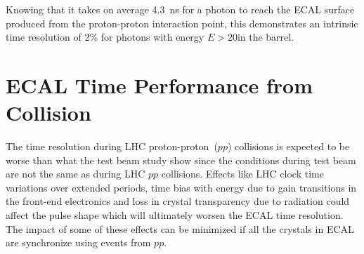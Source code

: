 \vspace{5mm}

Knowing that it takes on average 4.3~ns for a photon to reach the ECAL surface produced from the proton-proton interaction point, this demonstrates an intrinsic time resolution of 2\% for photons with energy $E > 20$\GeV in the barrel.%

\section{ECAL Time Performance from Collision}
The time resolution during LHC proton-proton~($pp$) collisions is expected to be worse than what the test beam study show since the conditions during test beam are not the same as during LHC $pp$ collisions. Effects like LHC clock time variations over extended periods, time bias with energy due to gain transitions in the front-end electronics and loss in crystal transparency due to radiation could affect the pulse shape which will ultimately worsen the ECAL time resolution. The impact of some of these effects can be minimized if all the crystals in ECAL are synchronize using events from $pp$. 

